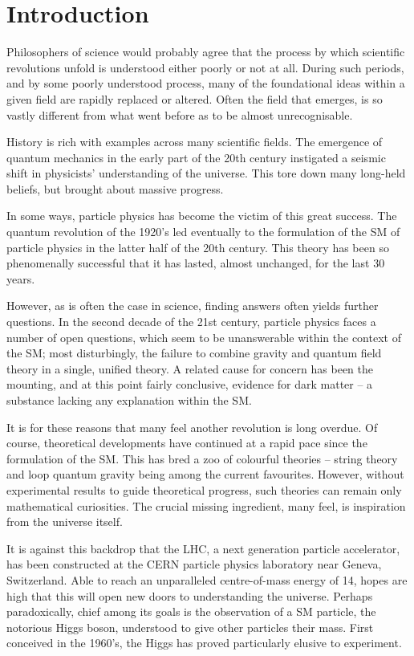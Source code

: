\chapter*{Introduction}

Philosophers of science would probably agree that the process by which
scientific revolutions unfold is understood either poorly or not at all. During
such periods, and by some poorly understood process, many of the foundational
ideas within a given field are rapidly replaced or altered. Often the field that
emerges, is so vastly different from what went before as to be almost
unrecognisable.

History is rich with examples across many scientific fields. The emergence of
quantum mechanics in the early part of the 20th century instigated a seismic
shift in physicists' understanding of the universe. This tore down many
long-held beliefs, but brought about massive progress.

In some ways, particle physics has become the victim of this great success. The
quantum revolution of the 1920's led eventually to the formulation of the
\acf{SM} of particle physics in the latter half of the 20th century. This theory
has been so phenomenally successful that it has lasted, almost unchanged, for
the last 30 years.

However, as is often the case in science, finding answers often yields further
questions. In the second decade of the 21st century, particle physics faces a
number of open questions, which seem to be unanswerable within the context of
the \ac{SM}; most disturbingly, the failure to combine gravity and quantum field
theory in a single, unified theory. A related cause for concern has been the
mounting, and at this point fairly conclusive, evidence for dark matter -- a
substance lacking any explanation within the \ac{SM}.

It is for these reasons that many feel another revolution is long overdue. Of
course, theoretical developments have continued at a rapid pace since the
formulation of the \ac{SM}. This has bred a zoo of colourful theories -- string
theory and loop quantum gravity being among the current favourites. However,
without experimental results to guide theoretical progress, such theories can
remain only mathematical curiosities. The crucial missing ingredient, many feel,
is inspiration from the universe itself.

It is against this backdrop that the \ac{LHC}, a next generation particle
accelerator, has been constructed at the \ac{CERN} particle physics laboratory
near Geneva, Switzerland. Able to reach an unparalleled centre-of-mass energy of
\unit{14}{\TeV}, hopes are high that this will open new doors to understanding
the universe. Perhaps paradoxically, chief among its goals is the observation of
a \ac{SM} particle, the notorious Higgs boson, understood to give other
particles their mass. First conceived in the 1960's, the Higgs has proved
particularly elusive to experiment.

